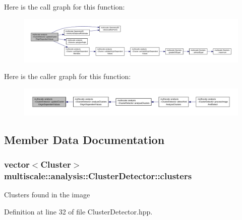 Here is the call graph for this function\-:
\nopagebreak
\begin{figure}[H]
\begin{center}
\leavevmode
\includegraphics[width=350pt]{classmultiscale_1_1analysis_1_1ClusterDetector_ac7e008a7674205095f94b91c8d7cdccc_cgraph}
\end{center}
\end{figure}




Here is the caller graph for this function\-:\nopagebreak
\begin{figure}[H]
\begin{center}
\leavevmode
\includegraphics[width=350pt]{classmultiscale_1_1analysis_1_1ClusterDetector_ac7e008a7674205095f94b91c8d7cdccc_icgraph}
\end{center}
\end{figure}




\subsection{Member Data Documentation}
\hypertarget{classmultiscale_1_1analysis_1_1ClusterDetector_aa81a8649bc743389c2fc1919d47eb5b3}{
\subsubsection[{clusters}]{\setlength{\rightskip}{0pt plus 5cm}vector$<${\bf Cluster}$>$ multiscale\-::analysis\-::\-Cluster\-Detector\-::clusters\hspace{0.3cm}{\ttfamily [protected]}}}\label{classmultiscale_1_1analysis_1_1ClusterDetector_aa81a8649bc743389c2fc1919d47eb5b3}
Clusters found in the image 

Definition at line 32 of file Cluster\-Detector.\-hpp.




